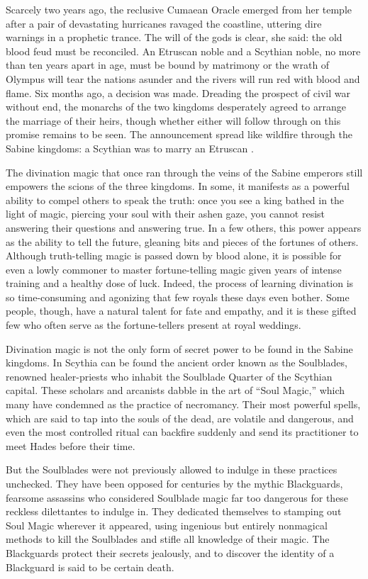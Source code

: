 \documentclass[blue]{Kos}
\begin{document}
Scarcely two years ago, the reclusive Cumaean Oracle emerged from her temple after a pair of devastating hurricanes ravaged the coastline, uttering dire warnings in a prophetic trance. The will of the gods is clear, she said: the old blood feud must be reconciled. An Etruscan noble and a Scythian noble, no more than ten years apart in age, must be bound by matrimony or the wrath of Olympus will tear the nations asunder and the rivers will run red with blood and flame. Six months ago, a decision was made. Dreading the prospect of civil war without end, the monarchs of the two kingdoms desperately agreed to arrange the marriage of their heirs, though whether either will follow through on this promise remains to be seen. The announcement spread like wildfire through the Sabine kingdoms: a Scythian \cBride{\prince} was to marry an Etruscan \cGroom{\prince}.

The divination magic that once ran through the veins of the Sabine emperors still empowers the scions of the three kingdoms. In some, it manifests as a powerful ability to compel others to speak the truth: once you see a king bathed in the light of magic, piercing your soul with their ashen gaze, you cannot resist answering their questions and answering true. In a few others, this power appears as the ability to tell the future, gleaning bits and pieces of the fortunes of others. Although truth-telling magic is passed down by blood alone, it is possible for even a lowly commoner to master fortune-telling magic given years of intense training and a healthy dose of luck. Indeed, the process of learning divination is so time-consuming and agonizing that few royals these days even bother. Some people, though, have a natural talent for fate and empathy, and it is these gifted few who often serve as the fortune-tellers present at royal weddings.

Divination magic is not the only form of secret power to be found in the Sabine kingdoms. In Scythia can be found the ancient order known as the Soulblades, renowned healer-priests who inhabit the Soulblade Quarter of the Scythian capital. These scholars and arcanists dabble in the art of ``Soul Magic,'' which many have condemned as the practice of necromancy. Their most powerful spells, which are said to tap into the souls of the dead, are volatile and dangerous, and even the most controlled ritual can backfire suddenly and send its practitioner to meet Hades before their time. 

But the Soulblades were not previously allowed to indulge in these practices unchecked. They have been opposed for centuries by the mythic Blackguards, fearsome assassins who considered Soulblade magic far too dangerous for these reckless dilettantes to indulge in. They dedicated themselves to stamping out Soul Magic wherever it appeared, using ingenious but entirely nonmagical methods to kill the Soulblades and stifle all knowledge of their magic. The Blackguards protect their secrets jealously, and to discover the identity of a Blackguard is said to be certain death.
\end{document}

